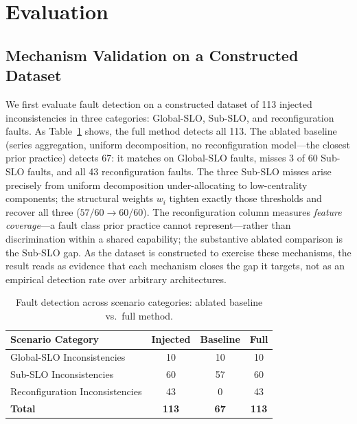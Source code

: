 \documentclass[conference]{IEEEtran}
\begin{document}
\section{Evaluation}\label{sec:eval}

\subsection{Mechanism Validation on a Constructed Dataset}\label{sec:eval-dataset}

We first evaluate fault detection on a constructed dataset of 113 injected inconsistencies in three categories: Global-SLO, Sub-SLO, and reconfiguration faults. As Table~\ref{tab:eval} shows, the full method detects all 113. The ablated baseline (series aggregation, uniform decomposition, no reconfiguration model---the closest prior practice) detects 67: it matches on Global-SLO faults, misses 3 of 60 Sub-SLO faults, and all 43 reconfiguration faults. The three Sub-SLO misses arise precisely from uniform decomposition under-allocating to low-centrality components; the structural weights $w_i$ tighten exactly those thresholds and recover all three ($57/60 \rightarrow 60/60$). The reconfiguration column measures \emph{feature coverage}---a fault class prior practice cannot represent---rather than discrimination within a shared capability; the substantive ablated comparison is the Sub-SLO gap. As the dataset is constructed to exercise these mechanisms, the result reads as evidence that each mechanism closes the gap it targets, not as an empirical detection rate over arbitrary architectures.

\begin{table}[htbp]
\caption{Fault detection across scenario categories: ablated baseline vs.\ full method.}
\begin{center}
\begin{tabular}{|l|c|c|c|}
\hline
\textbf{Scenario Category} & \textbf{Injected} &
\textbf{Baseline} & \textbf{Full} \\
\hline
Global-SLO Inconsistencies      & 10 & 10 & 10 \\
Sub-SLO Inconsistencies         & 60 & 57 & 60 \\
Reconfiguration Inconsistencies & 43 &  0 & 43 \\
\hline
\textbf{Total}                  & \textbf{113} & \textbf{67} & \textbf{113} \\
\hline
\end{tabular}
\label{tab:eval}
\end{center}
\end{table}
\end{document}
